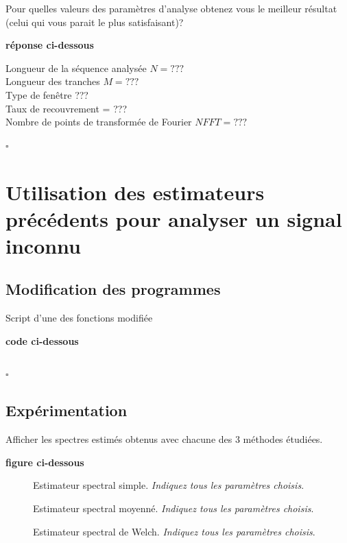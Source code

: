 \documentclass{article}
\newcommand{\debutrep}[1]{\color{blue}\begin{center} \hrulefill \textbf{ #1 } \hrulefill \end{center} }
\newcommand{\finrep}{\vspace*{5mm}\hfill $\square$\color{black}\vspace*{5mm}}
\begin{document}
Pour quelles valeurs des paramètres d'analyse obtenez vous le \og meilleur \fg résultat (celui qui vous parait le plus satisfaisant)?

\debutrep{réponse ci-dessous}

Longueur de la séquence analysée $N = ???$ \\
Longueur des tranches $M = ???$ \\
Type de fenêtre ??? \\
Taux de recouvrement = ??? \\
Nombre de points de transformée de Fourier $NFFT = ???$

\finrep

\section{Utilisation des estimateurs précédents pour analyser un signal inconnu}

\subsection{Modification des programmes}

Script d'une des fonctions modifiée

\debutrep{code ci-dessous}
\begin{verbatim}

\end{verbatim}
\finrep

\subsection{Expérimentation}

Afficher les spectres estimés obtenus avec chacune des 3 méthodes étudiées.

\debutrep{figure ci-dessous}
\begin{figure}[h]

\caption{Estimateur spectral simple. \textit{Indiquez tous les paramètres choisis}.}
\end{figure}

\begin{figure}[h]

\caption{Estimateur spectral moyenné. \textit{Indiquez tous les paramètres choisis}.}
\end{figure}

\begin{figure}[h]

\caption{Estimateur spectral de Welch. \textit{Indiquez tous les paramètres choisis}.}
\end{figure}
\end{document}
